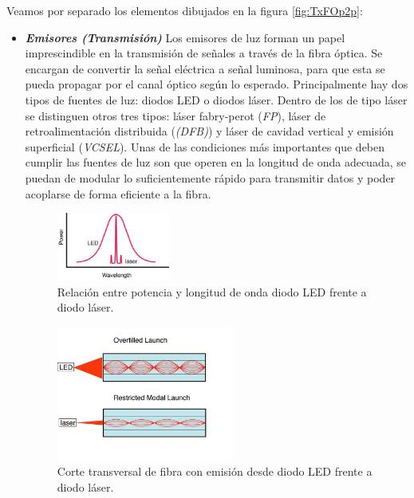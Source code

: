  Veamos por separado los elementos dibujados en la figura \ref{fig:TxFOp2p}:
 	\begin{itemize}
 		\item \textit{\textbf{Emisores (Transmisión)}}	
 		Los emisores de luz forman un papel imprescindible en la transmisión de señales a través de la fibra óptica. Se encargan de convertir la señal eléctrica a señal luminosa, para que esta se pueda propagar por el canal óptico según lo esperado. Principalmente hay dos tipos de fuentes de luz: diodos LED o diodos láser. Dentro de los de tipo láser se distinguen otros tres tipos: láser fabry-perot (\textit{FP}), láser de retroalimentación distribuida (\textit{(DFB)}) y láser de cavidad vertical y emisión superficial (\textit{VCSEL}). Unas de las condiciones más importantes que deben cumplir las fuentes de luz son que operen en la longitud de onda adecuada, se puedan de modular lo suficientemente rápido para transmitir datos y poder acoplarse de forma eficiente a la fibra. \cite{TransRecepFO}
 		
 		 \begin{figure}[H]
 			\centering
 			\includegraphics[width=0.35\textwidth]{./img/led-laser}
 			\caption{Relación entre potencia y longitud de onda diodo LED frente a diodo láser. \cite{FOA} } 
 			\label{fig:ledVsLaser}
 		\end{figure} 
 	 	\begin{figure}[H]
 			\centering
 			\includegraphics[width=0.55\textwidth]{./img/led-laserEMISION}
 			\caption{Corte transversal de fibra con emisión desde diodo LED frente a diodo láser. \cite{FOA} } 
 			\label{fig:corteledVsLaser}
 		\end{figure} 
 		

\end{itemize}
